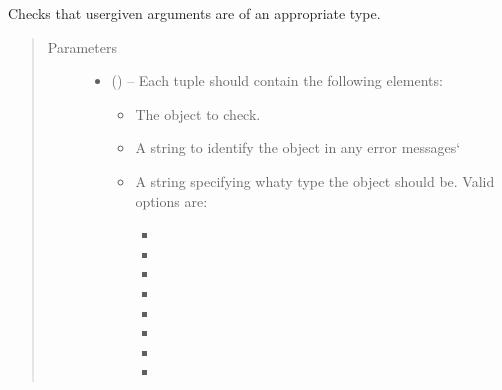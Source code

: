 \documentclass[letterpaper,10pt,english]{sphinxmanual}
\begin{document}
\begin{fulllineitems}
\label{\detokenize{references/misc:nmrespy._misc.ArgumentChecker}}
\sphinxAtStartPar
Checks that user\sphinxhyphen{}given arguments are of an appropriate type.
\begin{quote}\begin{description}
\item[{Parameters}] \leavevmode\begin{itemize}
\item {} 
\sphinxAtStartPar
{} () – 
\sphinxAtStartPar
Each tuple should contain the following elements:
\begin{itemize}
\item {} 
\sphinxAtStartPar
The object to check.

\item {} 
\sphinxAtStartPar
A string to identify the object in any error messages`

\item {} 
\sphinxAtStartPar
A string specifying whaty type the object should be. Valid
options are:
\begin{itemize}
\item {} 
\sphinxAtStartPar
{}

\item {} 
\sphinxAtStartPar
{}

\item {} 
\sphinxAtStartPar
{}

\item {} 
\sphinxAtStartPar
{}

\item {} 
\sphinxAtStartPar
{}

\item {} 
\sphinxAtStartPar
{}

\item {} 
\sphinxAtStartPar
{}

\item {} 
\sphinxAtStartPar
{}


\end{itemize}
\end{itemize}
\end{itemize}
\end{description}
\end{quote}
\end{fulllineitems}
\end{document}
